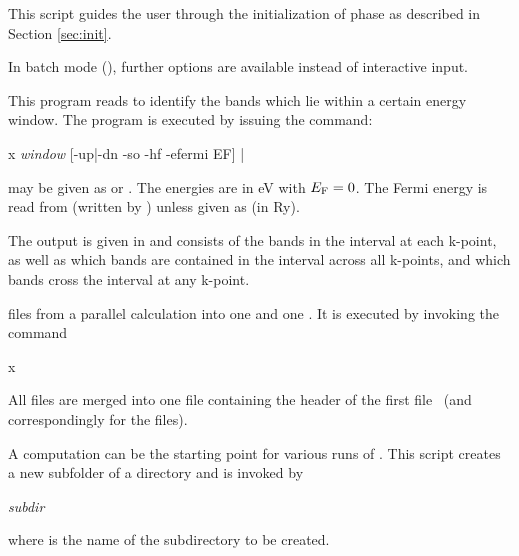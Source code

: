
This script guides the user through the initialization of \wtow phase
as described in Section \ref{sec:init}.
%
\begin{usage}
\end{usage}
%
In batch mode (), further options are available instead of
interactive input.



This program reads  to identify the bands which
lie within a certain energy window. The program \findbands is
executed by issuing the command:
%
\begin{usage}
  x \findbands \textit{window} [-up|-dn -so -hf -efermi EF]
  |
  \\
  \findbands {}
\end{usage}
%
 may be given as  or
.  The energies are in eV with $E_\text F = 0$.  The
Fermi energy is read from  (written by \prepwiiw)
unless given as  (in Ry).

The output is given in  and consists of the
bands in the interval at each k-point, as well as which bands are
contained in the interval across all k-points, and which bands cross
the interval at any k-point.



 files from a parallel calculation into one
 and one .  It is executed by
invoking the command
%
\begin{usage}
  x \joinvec [-up|-dn -c -so]
\end{usage}
%
All  files are merged into one  file
containing the header of the first file ~(and
correspondingly for the  files).



A \wien computation can be the starting point for various runs of
\wtow. This script creates a new subfolder of a \wien directory and is
invoked by
%
\begin{usage}
  \prepwiiw \textit{subdir}
\end{usage}
%
where  is the name of the subdirectory to be created.


